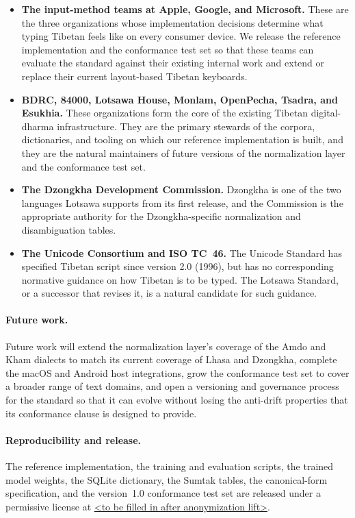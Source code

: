 \documentclass[11pt]{article}
\begin{document}
\begin{itemize}
\item \textbf{The input-method teams at Apple, Google, and Microsoft.} These are the three organizations whose implementation decisions determine what typing Tibetan feels like on every consumer device. We release the reference implementation and the conformance test set so that these teams can evaluate the standard against their existing internal work and extend or replace their current layout-based Tibetan keyboards.
\item \textbf{BDRC, 84000, Lotsawa House, Monlam, OpenPecha, Tsadra, and Esukhia.} These organizations form the core of the existing Tibetan digital-dharma infrastructure. They are the primary stewards of the corpora, dictionaries, and tooling on which our reference implementation is built, and they are the natural maintainers of future versions of the normalization layer and the conformance test set.
\item \textbf{The Dzongkha Development Commission.} Dzongkha is one of the two languages Lotsawa supports from its first release, and the Commission is the appropriate authority for the Dzongkha-specific normalization and disambiguation tables.
\item \textbf{The Unicode Consortium and ISO TC~46.} The Unicode Standard has specified Tibetan script since version 2.0 (1996), but has no corresponding normative guidance on how Tibetan is to be typed. The Lotsawa Standard, or a successor that revises it, is a natural candidate for such guidance.
\end{itemize}

\paragraph{Future work.} Future work will extend the normalization layer's coverage of the Amdo and Kham dialects to match its current coverage of Lhasa and Dzongkha, complete the macOS and Android host integrations, grow the conformance test set to cover a broader range of text domains, and open a versioning and governance process for the standard so that it can evolve without losing the anti-drift properties that its conformance clause is designed to provide.

\paragraph{Reproducibility and release.} The reference implementation, the training and evaluation scripts, the trained model weights, the SQLite dictionary, the Sumtak tables, the canonical-form specification, and the version~1.0 conformance test set are released under a permissive license at \url{<to be filled in after anonymization lift>}.
\end{document}
